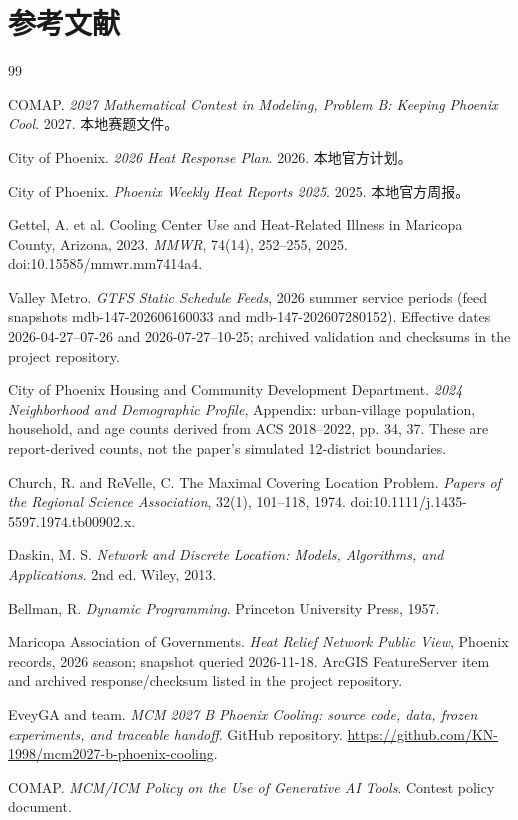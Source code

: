 \documentclass[12pt]{article}
\begin{document}
\section*{参考文献}
\begin{thebibliography}{99}

COMAP. \emph{2027 Mathematical Contest in Modeling, Problem B: Keeping Phoenix Cool}. 2027. 本地赛题文件。

City of Phoenix. \emph{2026 Heat Response Plan}. 2026. 本地官方计划。

City of Phoenix. \emph{Phoenix Weekly Heat Reports 2025}. 2025. 本地官方周报。

Gettel, A. et al. Cooling Center Use and Heat-Related Illness in Maricopa County, Arizona, 2023. \emph{MMWR}, 74(14), 252--255, 2025. doi:10.15585/mmwr.mm7414a4.

Valley Metro. \emph{GTFS Static Schedule Feeds}, 2026 summer service periods (feed snapshots mdb-147-202606160033 and mdb-147-202607280152). Effective dates 2026-04-27--07-26 and 2026-07-27--10-25; archived validation and checksums in the project repository.

City of Phoenix Housing and Community Development Department. \emph{2024 Neighborhood and Demographic Profile}, Appendix: urban-village population, household, and age counts derived from ACS 2018--2022, pp. 34, 37. These are report-derived counts, not the paper's simulated 12-district boundaries.

Church, R. and ReVelle, C. The Maximal Covering Location Problem. \emph{Papers of the Regional Science Association}, 32(1), 101--118, 1974. doi:10.1111/j.1435-5597.1974.tb00902.x.

Daskin, M. S. \emph{Network and Discrete Location: Models, Algorithms, and Applications}. 2nd ed. Wiley, 2013.

Bellman, R. \emph{Dynamic Programming}. Princeton University Press, 1957.

Maricopa Association of Governments. \emph{Heat Relief Network Public View}, Phoenix records, 2026 season; snapshot queried 2026-11-18. ArcGIS FeatureServer item and archived response/checksum listed in the project repository.

EveyGA and team. \emph{MCM 2027 B Phoenix Cooling: source code, data, frozen experiments, and traceable handoff}. GitHub repository. \url{https://github.com/KN-1998/mcm2027-b-phoenix-cooling}.

COMAP. \emph{MCM/ICM Policy on the Use of Generative AI Tools}. Contest policy document.

\end{thebibliography}
\end{document}
